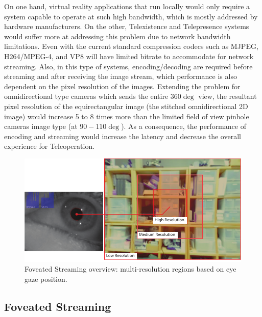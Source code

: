 On one hand, virtual reality applications that run locally would only require a system capable to operate at such high bandwidth, which is mostly addressed by hardware manufacturers. On the other, Telexistence and Telepresence systems would suffer more at addressing this problem due to network bandwidth limitations. Even with the current standard compression codecs such as MJPEG, H264/MPEG-4, and VP8 will have limited bitrate to accommodate for network streaming. Also, in this type of systems, encoding/decoding are required before streaming and after receiving the image stream, which performance is also dependent on the pixel resolution of the images. Extending the problem for omnidirectional type cameras which sends the entire $360\deg$ view, the resultant pixel resolution of the equirectangular image (the stitched omnidirectional 2D image) would increase 5 to 8 times more than the limited field of view pinhole cameras image type (at $90-110\deg$). As a consequence, the performance of encoding and streaming would increase the latency and decrease the overall experience for Teleoperation. 


\begin{figure} [t!]
\includegraphics[width=1\linewidth]{figures/system/Foveation.pdf}
\centering
  \captionsetup{justification=centering}
\caption{Foveated Streaming overview: multi-resolution regions based on eye gaze position.}
\label{fig.intro}
\end{figure}

\subsection{Foveated Streaming}

